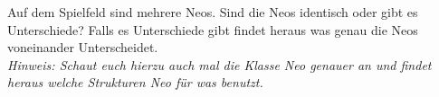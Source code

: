 
Auf dem Spielfeld sind mehrere Neos. Sind die Neos identisch oder gibt es Unterschiede? Falls es Unterschiede gibt findet heraus was genau die Neos voneinander Unterscheidet. \\
\textit{Hinweis: Schaut euch hierzu auch mal die Klasse Neo genauer an und findet heraus welche Strukturen Neo für was benutzt.}

